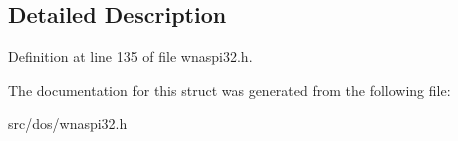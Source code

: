 \subsection{Detailed Description}


Definition at line 135 of file wnaspi32.\-h.



The documentation for this struct was generated from the following file\-:\begin{DoxyCompactItemize}
\item 
src/dos/wnaspi32.\-h\end{DoxyCompactItemize}
